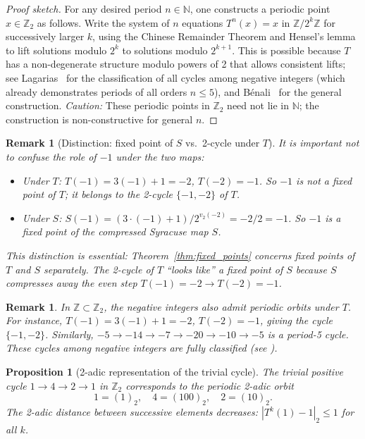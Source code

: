 \documentclass[12pt,a4paper]{article}
\newtheorem{proposition}[theorem]{Proposition}
\newtheorem{remark}[theorem]{Remark}
\begin{document}
\begin{proof}[Proof sketch]
For any desired period $n \in \mathbb{N}$, one constructs a periodic point
$x \in \mathbb{Z}_2$ as follows.  Write the system of $n$ equations $T^n(x) = x$
in $\mathbb{Z}/2^k\mathbb{Z}$ for successively larger $k$, using the Chinese Remainder
Theorem and Hensel's lemma to lift solutions modulo $2^k$ to solutions modulo $2^{k+1}$.
This is possible because $T$ has a non-degenerate structure modulo powers of 2 that
allows consistent lifts; see Lagarias~\cite{Lagarias1985} for the classification of
all cycles among negative integers (which already demonstrates periods of all orders
$n \leq 5$), and B\'{e}nali~\cite{Benali} for the general construction.
\emph{Caution:} These periodic points in $\mathbb{Z}_2$ need not lie in $\mathbb{N}$;
the construction is non-constructive for general $n$.
\end{proof}

\begin{remark}[Distinction: fixed point of $S$ vs.\ 2-cycle under $T$]\label{rem:T_vs_S}
It is important not to confuse the role of $-1$ under the two maps:
\begin{itemize}
  \item Under $T$: $T(-1) = 3(-1)+1 = -2$, $T(-2) = -1$. So $-1$ is \emph{not}
    a fixed point of $T$; it belongs to the 2-cycle $\{-1,-2\}$ of $T$.
  \item Under $S$: $S(-1) = (3\cdot(-1)+1)/2^{v_2(-2)} = -2/2 = -1$.
    So $-1$ \emph{is} a fixed point of the compressed Syracuse map $S$.
\end{itemize}
This distinction is essential: Theorem~\ref{thm:fixed_points} concerns fixed points
of $T$ and $S$ separately.  The 2-cycle of $T$ ``looks like'' a fixed point of $S$
because $S$ compresses away the even step $T(-1) = -2 \to T(-2) = -1$.
\end{remark}

\begin{remark}\label{rem:negative}
In $\mathbb{Z} \subset \mathbb{Z}_2$, the negative integers also admit periodic orbits
under $T$. For instance, $T(-1) = 3(-1)+1 = -2$, $T(-2) = -1$, giving the cycle
$\{-1, -2\}$. Similarly, $-5 \to -14 \to -7 \to -20 \to -10 \to -5$ is a period-5 cycle.
These cycles among negative integers are fully classified (see \cite{Lagarias1985}).
\end{remark}

\begin{proposition}[2-adic representation of the trivial cycle]\label{prop:trivial_cycle_2adic}
The trivial positive cycle $1 \to 4 \to 2 \to 1$ in $\mathbb{Z}_2$ corresponds to the
periodic 2-adic orbit
\[
  1 = (1)_2, \quad 4 = (100)_2, \quad 2 = (10)_2.
\]
The 2-adic distance between successive elements decreases: $|T^k(1) - 1|_2 \leq 1$ for all $k$.
\end{proposition}
\end{document}

